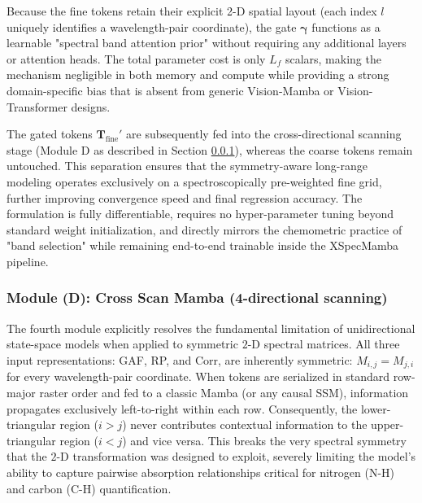 \documentclass[pdflatex,sn-mathphys-num]{sn-jnl}%
\begin{document}
Because the fine tokens retain their explicit 2-D spatial layout (each index $l$ uniquely identifies a wavelength-pair coordinate), the gate $\boldsymbol{\gamma}$ functions as a learnable "spectral band attention prior" without requiring any additional layers or attention heads. The total parameter cost is only $L_f$ scalars, making the mechanism negligible in both memory and compute while providing a strong domain-specific bias that is absent from generic Vision-Mamba or Vision-Transformer designs.

The gated tokens $\mathbf{T}_\text{fine}'$ are subsequently fed into the cross-directional scanning stage (Module D as described in Section \ref{sec:cross-scan-mamba}), whereas the coarse tokens remain untouched. This separation ensures that the symmetry-aware long-range modeling operates exclusively on a spectroscopically pre-weighted fine grid, further improving convergence speed and final regression accuracy. The formulation is fully differentiable, requires no hyper-parameter tuning beyond standard weight initialization, and directly mirrors the chemometric practice of "band selection" while remaining end-to-end trainable inside the XSpecMamba pipeline.

\subsubsection{Module (D): Cross Scan Mamba (4-directional scanning)}\label{sec:cross-scan-mamba}

The fourth module explicitly resolves the fundamental limitation of unidirectional state-space models when applied to symmetric $2$-D spectral matrices. All three input representations: GAF, RP, and Corr, are inherently symmetric: $M_{i,j} = M_{j,i}$ for every wavelength-pair coordinate. When tokens are serialized in standard row-major raster order and fed to a classic Mamba (or any causal SSM), information propagates exclusively left-to-right within each row. Consequently, the lower-triangular region ($i > j$) never contributes contextual information to the upper-triangular region ($i < j$) and vice versa. This breaks the very spectral symmetry that the $2$-D transformation was designed to exploit, severely limiting the model’s ability to capture pairwise absorption relationships critical for nitrogen (N-H) and carbon (C-H) quantification.
\end{document}
